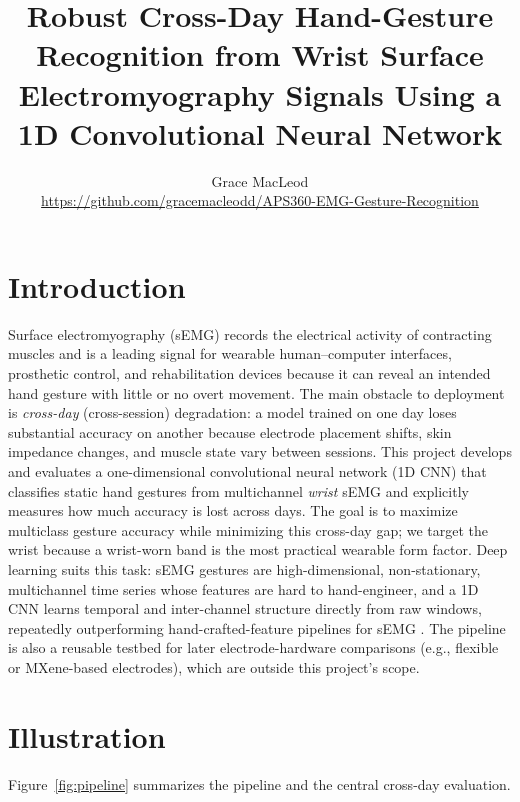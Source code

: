 \documentclass[final]{article}
\title{Robust Cross-Day Hand-Gesture Recognition from Wrist Surface\\
Electromyography Signals Using a 1D Convolutional Neural Network}
\author{%
  Grace MacLeod \\
  \url{https://github.com/gracemacleodd/APS360-EMG-Gesture-Recognition}
}
\begin{document}
\maketitle

\vspace{-0.55in}

\section*{Introduction}
Surface electromyography (sEMG) records the electrical activity of contracting muscles and is a leading signal for wearable human--computer interfaces, prosthetic control, and rehabilitation devices because it can reveal an intended hand gesture with little or no overt movement. The main obstacle to deployment is \emph{cross-day} (cross-session) degradation: a model trained on one day loses substantial accuracy on another because electrode placement shifts, skin impedance changes, and muscle state vary between sessions. This project develops and evaluates a one-dimensional convolutional neural network (1D CNN) that classifies static hand gestures from multichannel \emph{wrist} sEMG and explicitly measures how much accuracy is lost across days. The goal is to maximize multiclass gesture accuracy while minimizing this cross-day gap; we target the wrist because a wrist-worn band is the most practical wearable form factor. Deep learning suits this task: sEMG gestures are high-dimensional, non-stationary, multichannel time series whose features are hard to hand-engineer, and a 1D CNN learns temporal and inter-channel structure directly from raw windows, repeatedly outperforming hand-crafted-feature pipelines for sEMG \citep{atzori2016deep,coteallard2019transfer}. The pipeline is also a reusable testbed for later electrode-hardware comparisons (e.g., flexible or MXene-based electrodes), which are outside this project's scope.

\section*{Illustration}
Figure~\ref{fig:pipeline} summarizes the pipeline and the central cross-day evaluation.
\end{document}
